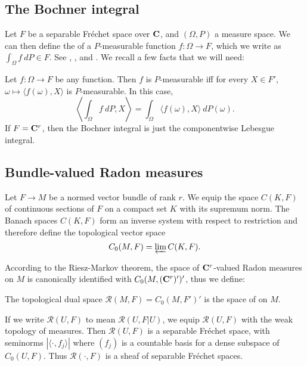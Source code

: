 
\subsection{The Bochner integral}
Let $F$ be a separable Fr\'echet space over $\mathbf{C}$, and $(\Omega, P)$ a measure space.
We can then define the  of a $P$-measurable function $f: \Omega \to F$, which we write as $\int_\Omega f ~dP \in F$.
See \cite{Rieffel70}, \cite{MO47721}, and \cite[Chapter V]{yosida2012functional}.
We recall a few facts that we will need:

\begin{theorem}[Pettis]
Let $f: \Omega \to F$ be any function.
Then $f$ is $P$-measurable iff for every $X \in F'$, $\omega \mapsto \langle f(\omega), X\rangle$ is $P$-measurable.
In this case,
$$\left\langle \int_\Omega f ~dP, X\right\rangle = \int_\Omega \langle f(\omega), X\rangle ~dP(\omega).$$
If $F = \mathbf{C}^r$, then the Bochner integral is just the componentwise Lebesgue integral.
\end{theorem}


\subsection{Bundle-valued Radon measures}
Let $F \to M$ be a normed vector bundle of rank $r$.
We equip the space $C(K, F)$ of continuous sections of $F$ on a compact set $K$ with its supremum norm.
The Banach spaces $C(K, F)$ form an inverse system with respect to restriction and therefore define the topological vector space
$$C_0(M, F) = \varprojlim C(K, F).$$

According to the Riesz-Markov theorem, the space of $\mathbf{C}^r$-valued Radon measures on $M$ is canonically identified with $C_0(M, (\mathbf{C}^r)')'$, thus we define:

\begin{definition}
The topological dual space $\mathcal R(M, F) = C_0(M, F')'$ is the space of  on $M$.
\end{definition}

If we write $\mathcal R(U, F)$ to mean $\mathcal R(U, F|U)$, we equip $\mathcal R(U, F)$ with the weak topology of measures.
Then $\mathcal R(U, F)$ is a separable Fr\'echet space, with seminorms $|\langle \cdot, f_j\rangle|$ where $(f_j)$ is a countable basis for a dense subspace of $C_0(U, F)$.
Thus $\mathcal R(\cdot, F)$ is a sheaf of separable Fr\'echet spaces.

